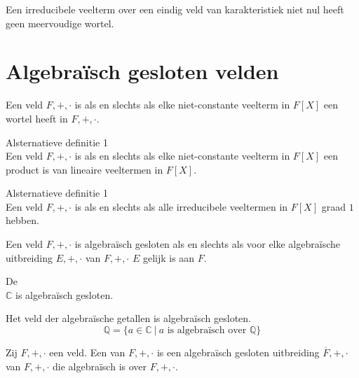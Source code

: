 \documentclass[main.tex]{subfiles}
\begin{document}
\begin{st}
  Een irreducibele veelterm over een eindig veld van karakteristiek niet nul heeft geen meervoudige wortel.
  \zb
\end{st}

\section{Algebra\"isch gesloten velden}
\label{sec:algebr-gesl-veld}

\begin{de}
  Een veld $F,+,\cdot$ is  als en slechts als elke niet-constante veelterm in $F[X]$ een wortel heeft in $F,+,\cdot$.
\end{de}

\begin{st}
  Alsternatieve definitie 1\\
  Een veld $F,+,\cdot$ is  als en slechts als elke niet-constante veelterm in $F[X]$ een product is van lineaire veeltermen in $F[X]$.
\end{st}

\begin{st}
  Alsternatieve definitie 1\\
  Een veld $F,+,\cdot$ is  als en slechts als alle irreducibele veeltermen in $F[X]$ graad $1$ hebben.
\end{st}

\begin{ei}
  Een veld $F,+,\cdot$ is algebra\"isch gesloten als en slechts als voor elke algebra\"ische uitbreiding $E,+,\cdot$ van $F,+,\cdot$ $E$ gelijk is aan $F$.
\end{ei}

\begin{st}
  De \\
  $\mathbb{C}$ is algebra\"isch gesloten.
\zb 
{}
\end{st}


\begin{pr}
  Het veld der algebra\"ische getallen is algebra\"isch gesloten.
  \[ \mathbb{Q} = \{ a \in \mathbb{C} \ |\ a \text{ is algebra\"isch over } \mathbb{Q} \} \]
\end{pr}

\begin{de}
  Zij $F,+,\cdot$ een veld.
  Een  van $F,+,\cdot$ is een algebra\"isch gesloten uitbreiding $\overline{F},+,\cdot$ van $F,+,\cdot$ die algebra\"isch is over $F,+,\cdot$.
\end{de}
\end{document}
